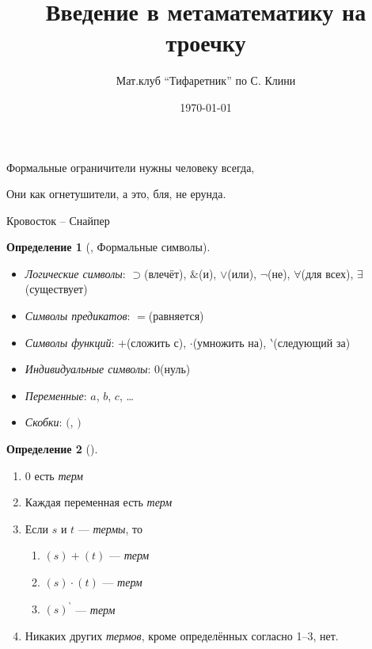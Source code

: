 \documentclass[a4paper, 12pt]{article}  %
\author{Мат.клуб ``Тифаретник'' по С. Клини}
\title{Введение в метаматематику на троечку}
\date{\today}
\DeclareMathOperator{\conj}{\mathbb{\&}}
\theoremstyle{definition}
\newtheorem*{definition}{Определение}
\begin{document}
	\maketitle
	
	\epigraph{
		Формальные ограничители нужны человеку всегда,
			
		Они как огнетушители, а это, бля, не ерунда.
	}{Кровосток -- Снайпер}


	\begin{definition}[,  Формальные символы]
		\leavevmode	
		\begin{itemize}
			\setlength\itemsep{-3pt}
			\item \textit{Логические символы}: 
				$\supset$(влечёт), $\conj$(и), $\vee$(или),
				$\neg$(не), $\forall$(для всех), $\exists$(существует)
			\item \textit{Символы предикатов}: $=$(равняется)
			\item \textit{Символы функций}: 
				$+$(сложить с), $\cdot$(умножить на), $\backprime$(следующий за)
			\item \textit{Индивидуальные символы}: $0$(нуль)
			\item \textit{Переменные}: $a$, $b$, $c$, \dots
			\item \textit{Скобки}: $($, $)$
		\end{itemize}
	\end{definition}
	
	\begin{definition}[]
		\leavevmode			
		\begin{enumerate}
			\setlength\itemsep{-3pt}	
			\item $0$ есть \textit{терм}
			\item Каждая переменная есть \textit{терм}
			\item Если $s$ и $t$ --- \textit{термы}, то
			\begin{multicols}{4}
				\begin{enumerate}
				\item $(s)+(t)$          --- \textit{терм}
				\item $(s) \cdot (t)$    --- \textit{терм}
				\item $(s)^{\backprime}$ --- \textit{терм}
				\end{enumerate}
			\end{multicols}
			\item Никаких других \textit{термов}, кроме определённых согласно 1--3, нет.
		\end{enumerate}
	\end{definition}
\end{document}
